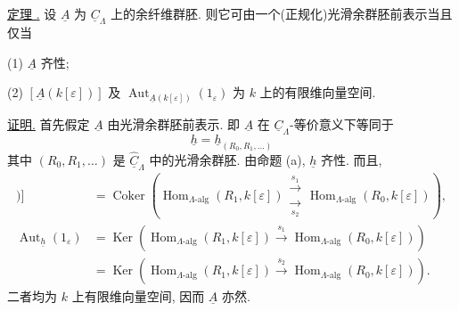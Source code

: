 \underline{定理 .}
设 $\underline A$ 为 $\underline C_\Lambda$ 上的余纤维群胚.
则它可由一个(正规化)光滑余群胚前表示当且仅当


(1) $\underline A$ 齐性;

(2) $[\underline A(k[\varepsilon])]$ 及
$\operatorname{Aut}_{\underline A(k[\varepsilon])}(1_\varepsilon)$
为 $k$ 上的有限维向量空间.

\underline{证明.} 首先假定 $\underline A$ 由光滑余群胚前表示.
即 $\underline A$ 在 $\underline C_\Lambda$-等价意义下等同于
\[
 \underline h=\underline h_{(R_0,R_1,\ldots)}
\]
其中 $(R_0,R_1,\ldots)$ 是 $\widehat{\underline C}_\Lambda$ 中的光滑余群胚.
由命题 (a), $\underline h$ 齐性.
而且,
\begin{align*}
 [\underline h(k[\varepsilon])]
 &=\operatorname{Coker}\!\left(
   \operatorname{Hom}_{\Lambda\text{-alg}}(R_1,k[\varepsilon])
   \mathrel{\substack{\xrightarrow{\ s_1\ }\\[-.6ex]
                       \xrightarrow[\ s_2\ ]{}}}
   \operatorname{Hom}_{\Lambda\text{-alg}}(R_0,k[\varepsilon])
   \right),\\[1ex]
 \operatorname{Aut}_{\underline h}(1_\varepsilon)
 &=\operatorname{Ker}\!\left(
   \operatorname{Hom}_{\Lambda\text{-alg}}(R_1,k[\varepsilon])
   \xrightarrow{\ s_1\ }
   \operatorname{Hom}_{\Lambda\text{-alg}}(R_0,k[\varepsilon])
   \right)\\
 &=\operatorname{Ker}\!\left(
   \operatorname{Hom}_{\Lambda\text{-alg}}(R_1,k[\varepsilon])
   \xrightarrow{\ s_2\ }
   \operatorname{Hom}_{\Lambda\text{-alg}}(R_0,k[\varepsilon])
   \right).
\end{align*}
二者均为 $k$ 上有限维向量空间, 因而 $\underline A$ 亦然.

